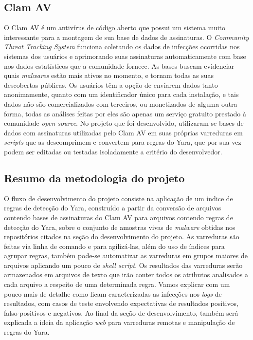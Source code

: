 \subsection{Clam AV}
\label{sub:clamav}

O Clam AV é um antivírus de código aberto que possui um sistema muito interessante para a montagem de sua base de dados de assinaturas. O \textit{Community Threat Tracking System} funciona coletando os dados de infecções ocorridas nos sistemas dos usuários e aprimorando suas assinaturas automaticamente com base nos dados estatísticos que a comunidade fornece. As bases buscam evidenciar quais \textit{malwares} estão mais ativos no momento, e tornam todas as suas descobertas públicas. Os usuários têm a opção de enviarem dados tanto anonimamente, quanto com um identificador único para cada instalação, e tais dados não são comercializados com terceiros, ou monetizados de alguma outra forma, todas as análises feitas por eles são apenas um serviço gratuito prestado à comunidade \textit{open source}.
No projeto que foi desenvolvido, utilizaram-se bases de dados com assinaturas utilizadas pelo Clam AV em suas próprias varreduras em \textit{scripts} que as descomprimem e convertem para regras do Yara, que por sua vez podem ser editadas ou testadas isoladamente a critério do desenvolvedor.


\subsection{Resumo da metodologia do projeto}
\label{ss.resumo}

O fluxo de desenvolvimento do projeto consiste na aplicação de um índice de regras de detecção do Yara, construído a partir da conversão de arquivos contendo bases de assinaturas do Clam AV para arquivos contendo regras de detecção do Yara, sobre o conjunto de amostras vivas de \textit{malware} obtidas nos repositórios citados na seção do desenvolvimento do projeto. As varreduras são feitas via linha de comando e para agilizá-las, além do uso de índices para agrupar regras, também pode-se automatizar as varreduras em grupos maiores de arquivos aplicando um pouco de \textit{shell script}. Os resultados das varreduras serão armazenados em arquivos de texto que irão conter todos os atributos analisados a cada arquivo a respeito de uma determinada regra. Vamos explicar com um pouco mais de detalhe como ficam caracterizadas as infecções nos \textit{logs} de resultados, com casos de teste envolvendo expectativas de resultados positivos, falso-positivos e negativos. Ao final da seção de desenvolvimento, também será explicada a ideia da aplicação \textit{web} para varreduras remotas e manipulação de regras do Yara.